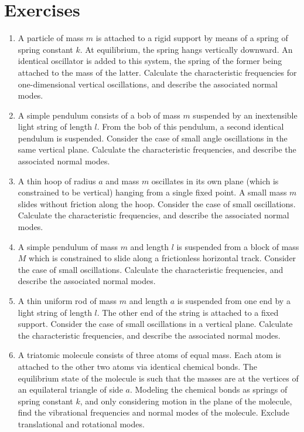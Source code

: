 \section{Exercises}
{\small
\renewcommand{\theenumi}{11.\arabic{enumi}}
\begin{enumerate}
\item A particle of mass $m$ is attached to a rigid support by means of a spring of
spring constant $k$. At equilibrium, the spring hangs vertically
downward. An identical oscillator is added to this system, the
spring of the former being attached to the mass of the latter.
Calculate the characteristic frequencies for one-dimensional vertical
oscillations, and describe the associated normal modes.

\item A simple pendulum consists of a bob of mass $m$ suspended
by an inextensible light string of length $l$. From the bob of
this pendulum, a second identical
pendulum is suspended. Consider the case of small angle oscillations
in the same vertical plane. Calculate the characteristic frequencies, and describe the associated normal modes.

\item A thin hoop of radius $a$ and mass $m$ oscillates in its
own plane (which is constrained to be vertical) hanging from a single fixed point. A small mass $m$ slides
without friction along the hoop. Consider the case of small oscillations.
Calculate the characteristic frequencies, and describe the associated normal modes.

\item A simple pendulum of mass $m$ and length $l$ is suspended from
 a block of mass $M$ which is constrained to slide along a frictionless
horizontal track. Consider the case of small oscillations. Calculate the characteristic frequencies, and describe the associated normal modes.

\item A thin uniform rod of mass $m$ and length $a$ is suspended from
one end by a light string of length $l$. The other end of the string
is attached to a fixed support. Consider the case of small oscillations
in a vertical plane. 
Calculate the characteristic frequencies, and describe the associated normal modes.

\item A triatomic molecule consists of three atoms of equal mass.
Each atom is attached to the other two atoms via identical chemical bonds.
The equilibrium state of the molecule is such that the masses are at the vertices of 
an equilateral triangle of side $a$. Modeling the chemical bonds as
springs of spring constant $k$, and only considering motion in the plane of the molecule, find the vibrational frequencies and normal modes of the molecule. Exclude translational and rotational modes. 
\end{enumerate}
}
